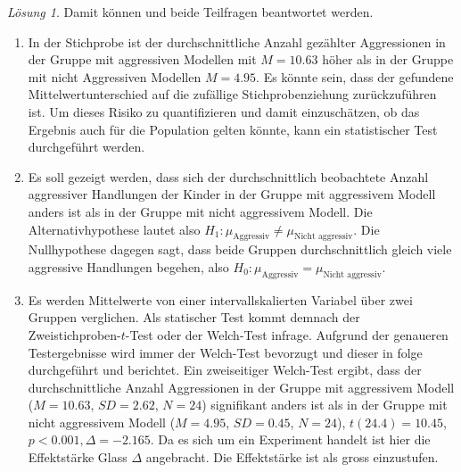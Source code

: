 \documentclass[
]{book}
\providecommand{\tightlist}{%
  \setlength{\itemsep}{0pt}\setlength{\parskip}{0pt}}
\theoremstyle{definition}
\theoremstyle{definition}
\theoremstyle{definition}
\theoremstyle{definition}
\theoremstyle{remark}
\newtheorem*{solution}{Lösung}
\begin{document}
\begin{solution}
Damit können und beide Teilfragen beantwortet werden.

\begin{enumerate}
\def\labelenumi{\alph{enumi})}
\tightlist
\item
  In der Stichprobe ist der durchschnittliche Anzahl gezählter Aggressionen in der Gruppe mit aggressiven Modellen mit \(M = 10.63\) höher als in der Gruppe mit nicht Aggressiven Modellen \(M = 4.95\). Es könnte sein, dass der gefundene Mittelwertunterschied auf die zufällige Stichprobenziehung zurückzuführen ist. Um dieses Risiko zu quantifizieren und damit einzuschätzen, ob das Ergebnis auch für die Population gelten könnte, kann ein statistischer Test durchgeführt werden.
\item
  Es soll gezeigt werden, dass sich der durchschnittlich beobachtete Anzahl aggressiver Handlungen der Kinder in der Gruppe mit aggressivem Modell anders ist als in der Gruppe mit nicht aggressivem Modell. Die Alternativhypothese lautet also \(H_1: \mu_\text{Aggressiv} \neq \mu_\text{Nicht aggressiv}\). Die Nullhypothese dagegen sagt, dass beide Gruppen durchschnittlich gleich viele aggressive Handlungen begehen, also \(H_0: \mu_\text{Aggressiv} = \mu_\text{Nicht aggressiv}\).
\item
  Es werden Mittelwerte von einer intervallskalierten Variabel über zwei Gruppen verglichen. Als statischer Test kommt demnach der Zweistichproben-\(t\)-Test oder der Welch-Test infrage. Aufgrund der genaueren Testergebnisse wird immer der Welch-Test bevorzugt und dieser in folge durchgeführt und berichtet. Ein zweiseitiger Welch-Test ergibt, dass der durchschnittliche Anzahl Aggressionen in der Gruppe mit aggressivem Modell (\(M = 10.63\), \(SD = 2.62\), \(N = 24\)) signifikant anders ist als in der Gruppe mit nicht aggressivem Modell (\(M = 4.95\), \(SD = 0.45\), \(N = 24\)), \(t(24.4) = 10.45\), \(p < 0.001, \Delta = -2.165\). Da es sich um ein Experiment handelt ist hier die Effektstärke Glass \(\Delta\) angebracht. Die Effektstärke ist als gross einzustufen.
\end{enumerate}

\end{solution}
\end{document}
